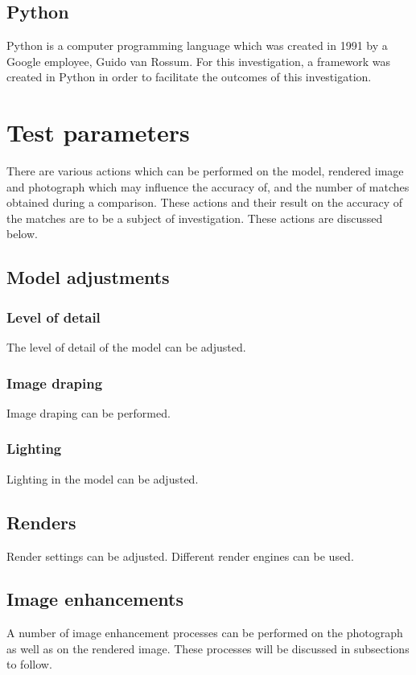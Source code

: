 \documentclass[11pt,a4paper]{report}
\begin{document}
		\subsection{Python}
			Python is a computer programming language which was created in 1991 by a Google employee, Guido van Rossum. For this investigation, a framework was created in Python in order to facilitate the outcomes of this investigation.

	\section{Test parameters}
	\label{test_parameters}
		There are various actions which can be performed on the model, rendered image and photograph which may influence the accuracy of, and the number of matches obtained during a comparison. These actions and their result on the accuracy of the matches are to be a subject of investigation. These actions are discussed below.
		
		\subsection{Model adjustments}
			\subsubsection{Level of detail}
				The level of detail of the model can be adjusted.
				
			\subsubsection{Image draping}
				Image draping can be performed.
			
			\subsubsection{Lighting}
				Lighting in the model can be adjusted.
		
		\subsection{Renders}
			Render settings can be adjusted.
			Different render engines can be used.
			
		\subsection{Image enhancements}
			A number of image enhancement processes can be performed on the photograph as well as on the rendered image. These processes will be discussed in subsections to follow.
\end{document}
